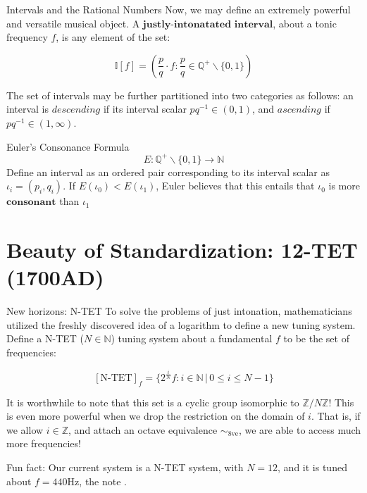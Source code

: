 \documentclass[usenames,dvipsnames]{beamer}
\newcommand{\N}{\mathbb{N}}
\newcommand{\Q}{\mathbb{Q}}
\newcommand{\Z}{\mathbb{Z}}
\newcommand{\octave}{\sim_{8\text{ve}}}
\newcommand{\Hz}{\text{Hz}}
\begin{document}
    
  \begin{frame}{Intervals and the Rational Numbers}
  Now, we may define an extremely powerful and versatile musical object. A $\textbf{justly-intonatated interval}$, about a tonic frequency $f$, is any element of the set: 
  
  $$ \mathbb{I}[f] = \left( \frac{p}{q} \cdot f : \frac{p}{q} \in \Q^+ \backslash \{0,1\} \right) $$
  
  The set of intervals may be further partitioned into two categories as follows:
  an interval is $\textit{descending}$ if its interval scalar $pq^{-1} \in (0,1)$, and $\textit{ascending}$ if $pq^{-1} \in (1,\infty)$.
  
  \end{frame}
  
  \begin{frame}{Euler's Consonance Formula}
  $$ E: \Q^+ \backslash \{0,1\} \rightarrow \N $$
Define an interval as an ordered pair corresponding to its interval scalar as $\iota_i = (p_i,q_i)$. If $E(\iota_0) < E(\iota_1)$, Euler believes that this entails that $\iota_0$ is more $\textbf{consonant}$ than $\iota_1$
    \end{frame}
  
  \section{Beauty of Standardization: 12-TET (1700AD)}
  
  \begin{frame}{New horizons: N-TET}
  To solve the problems of just intonation, mathematicians utilized the freshly discovered idea of a logarithm to define a new tuning system. Define a N-TET ($N \in \N$) tuning system about a fundamental $f$ to be the set of frequencies: 
  
  $$ [\text{N-TET}]_f = \{ 2^{\frac{i}{N}} f :  i \in \N \, | \, 0 \leq i \leq N-1 \}$$
  
  It is worthwhile to note that this set is a cyclic group isomorphic to $\Z/N\Z$! This is even more powerful when we drop the restriction on the domain of $i$. That is, if we allow $i \in \Z$, and attach an octave equivalence $\octave$, we are able to access much more frequencies!
  
  Fun fact: Our current system is a N-TET system, with $N = 12$, and it is tuned about $f = 440\Hz$, the note .
  \end{frame}
  
\end{document}
